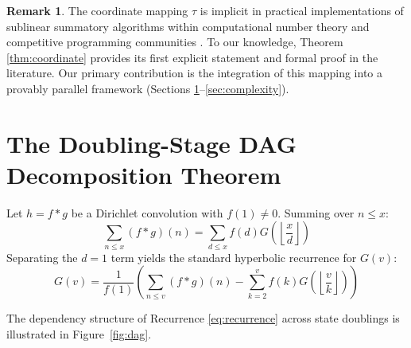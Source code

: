 \documentclass[11pt,a4paper]{article}
\theoremstyle{plain}
\theoremstyle{definition}
\newtheorem{remark}[theorem]{Remark}
\newcommand{\floor}[1]{\left\lfloor #1 \right\rfloor}
\begin{document}
\begin{remark}
The coordinate mapping $\tau$ is implicit in practical implementations of sublinear summatory algorithms within computational number theory and competitive programming communities \cite{lucy2011algorithm, min25sieve}. To our knowledge, Theorem \ref{thm:coordinate} provides its first explicit statement and formal proof in the literature. Our primary contribution is the integration of this mapping into a provably parallel framework (Sections \ref{sec:dag}--\ref{sec:complexity}).
\end{remark}


\section{The Doubling-Stage DAG Decomposition Theorem}
\label{sec:dag}

Let $h = f * g$ be a Dirichlet convolution with $f(1) \neq 0$. Summing over $n \le x$:
\begin{equation}
    \sum_{n \le x} (f * g)(n) = \sum_{d \le x} f(d) G\left(\floor{\frac{x}{d}}\right)
\end{equation}
Separating the $d=1$ term yields the standard hyperbolic recurrence for $G(v)$:
\begin{equation}
    G(v) = \frac{1}{f(1)} \left( \sum_{n \le v} (f * g)(n) - \sum_{k=2}^v f(k) G\left(\floor{\frac{v}{k}}\right) \right)
    \label{eq:recurrence}
\end{equation}

The dependency structure of Recurrence \eqref{eq:recurrence} across state doublings is illustrated in Figure~\ref{fig:dag}.
\end{document}
